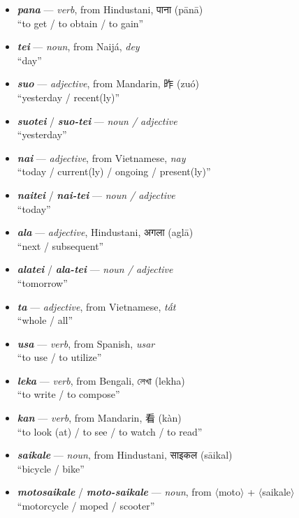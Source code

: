 \documentclass[a4paper, titlepage]{article}
\begin{document}
\begin{itemize}
	\item \textbf{\textit{pana}} — \textit{verb}, from Hindustani, {\hmfont पाना} (pānā) \\ ``to get / to obtain / to gain''
	\item \textbf{\textit{tei}} — \textit{noun}, from Naijá, \textit{dey} \\ ``day''
	\item \textbf{\textit{suo}} — \textit{adjective}, from Mandarin, 昨 (zuó) \\ ``yesterday / recent(ly)''
	\item \textbf{\textit{suotei}} / \textbf{\textit{suo-tei}} — \textit{noun /  adjective} \\ ``yesterday''
	\item \textbf{\textit{nai}} — \textit{adjective}, from Vietnamese, \textit{nay} \\ ``today / current(ly) / ongoing / present(ly)''
	\item \textbf{\textit{naitei}} / \textbf{\textit{nai-tei}} — \textit{noun /  adjective} \\ ``today''
	\item \textbf{\textit{ala}} — \textit{adjective}, Hindustani, {\hmfont अगला} (aglā) \\ ``next / subsequent''
	\item \textbf{\textit{alatei}} / \textbf{\textit{ala-tei}} — \textit{noun /  adjective} \\ ``tomorrow''
	\item \textbf{\textit{ta}} — \textit{adjective}, from Vietnamese, \textit{tất} \\``whole / all''
	\item \textbf{\textit{usa}} — \textit{verb}, from Spanish, \textit{usar} \\``to use /  to utilize''
	\item \textbf{\textit{leka}} — \textit{verb}, from Bengali, {\benfont লেখা} (lekha) \\``to write /  to compose''
	\item \textbf{\textit{kan}} — \textit{verb}, from Mandarin, 看 (kàn) \\``to look (at) / to see / to watch / to read''
	\item \textbf{\textit{saikale}}  — \textit{noun}, from Hindustani, {\hmfont साइकल} (sāikal) \\``bicycle / bike''
	\item \textbf{\textit{motosaikale}} / \textbf{\textit{moto-saikale}}  — \textit{noun}, from $\langle$moto$\rangle$ + $\langle$saikale$\rangle$ \\``motorcycle / moped / scooter''

\end{itemize}
\end{document}
